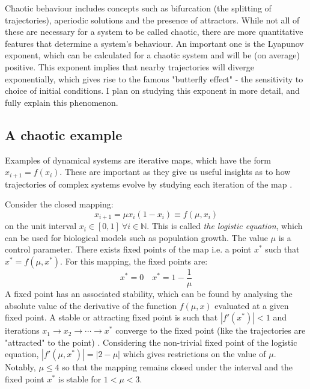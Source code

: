 \documentclass[12pt,a4paper]{amsart}
\begin{document}

Chaotic behaviour includes concepts such as bifurcation (the splitting of trajectories), aperiodic solutions and the presence of attractors. While not all of these are necessary for a system to be called chaotic, there are more quantitative features that determine a system's behaviour. An important one is the Lyapunov exponent, which can be calculated for a chaotic system and will be (on average) positive. This exponent implies that nearby trajectories will diverge exponentially, which gives rise to the famous "butterfly effect" - the sensitivity to choice of initial conditions. I plan on studying this exponent in more detail, and fully explain this phenomenon.

\subsection{A chaotic example}

Examples of dynamical systems are iterative maps, which have the form $x_{i+1} = f(x_{i})$. These are important as they give us useful insights as to how trajectories of complex systems evolve by studying each iteration of the map \cite{HILBORN}.

Consider the closed mapping: $$x_{i+1} = {\mu} x_{i} (1 - x_{i}) \equiv f(\mu, x_{i}) \label{mapping}$$ on the unit interval $x_{i} \in [0, 1] \  {\forall}i \in \mathbb{N}$. This is called \textit{the logistic equation}, which can be used for biological models such as population growth. The value $\mu$ is a control parameter. There exists fixed points of the map i.e. a point $x^{*}$ such that $x^{*} = f(\mu, x^{*})$. For this mapping, the fixed points are: $$x^{*} = 0 \quad x^{*} = 1 - \frac{1}{\mu}$$ A fixed point has an associated stability, which can be found by analysing the absolute value of the derivative of the function $f(\mu, x)$ evaluated at a given fixed point. A stable or attracting fixed point is such that $|f'(x^{*})| < 1$ and iterations $x_{1} \rightarrow x_{2} \rightarrow \cdots \rightarrow x^{*}$ converge to the fixed point (like the trajectories are "attracted" to the point) \cite{SCHECK}. Considering the non-trivial fixed point of the logistic equation, $|f'(\mu, x^{*})| = |2 - \mu|$ which gives restrictions on the value of $\mu$. Notably, $\mu \leq 4$ so that the mapping remains closed under the interval and the fixed point $x^{*}$ is stable for $1 < \mu < 3$. 
\end{document}
